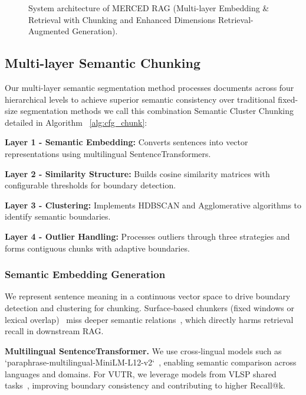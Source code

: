\documentclass[10pt,twocolumn,letterpaper]{article}
\begin{document}
\begin{figure}[!htbp]
    \centering
    
    \caption{System architecture of MERCED RAG (Multi-layer Embedding \& Retrieval with Chunking and Enhanced Dimensions Retrieval-Augmented Generation).}
    \label{fig:system_architecture}
\end{figure}

\subsection{Multi-layer Semantic Chunking}

Our multi-layer semantic segmentation method processes documents across four hierarchical levels to achieve superior semantic consistency over traditional fixed-size segmentation methods we call this combination Semantic Cluster Chunking detailed in Algorithm ~\ref{alg:cfg_chunk}:

\vspace{0.5em}
\textbf{Layer 1 - Semantic Embedding:} Converts sentences into vector representations using multilingual SentenceTransformers.

\textbf{Layer 2 - Similarity Structure:} Builds cosine similarity matrices with configurable thresholds for boundary detection.

\textbf{Layer 3 - Clustering:} Implements HDBSCAN and Agglomerative algorithms to identify semantic boundaries.

\textbf{Layer 4 - Outlier Handling:} Processes outliers through three strategies and forms contiguous chunks with adaptive boundaries.

\subsubsection{Semantic Embedding Generation}

We represent sentence meaning in a continuous vector space to drive boundary detection and clustering for chunking. Surface‑based chunkers (fixed windows or lexical overlap)~\cite{smith2023fixed} miss deeper semantic relations~\cite{zhang2024semantic}, which directly harms retrieval recall in downstream RAG.

\textbf{Multilingual SentenceTransformer.}
We use cross‑lingual models such as `paraphrase-multilingual-MiniLM-L12-v2`~\cite{reimers2019sentence}, enabling semantic comparison across languages and domains. For VUTR, we leverage models from VLSP shared tasks~\cite{nguyen2020underthesea}, improving boundary consistency and contributing to higher Recall@k.
\end{document}
